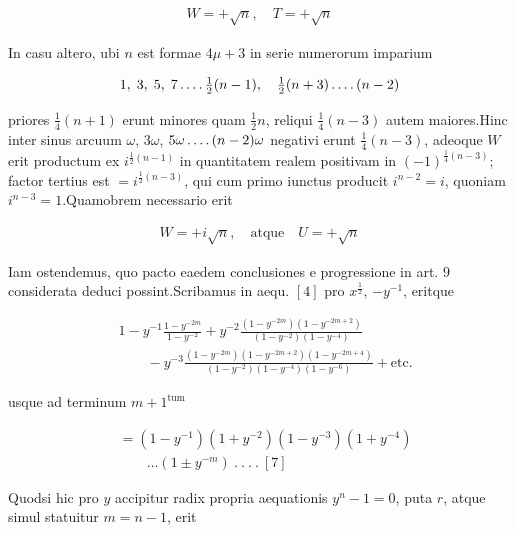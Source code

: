\[
\begin{aligned}
W=+\surd n,\quad T=+\surd n
\end{aligned}
\]

In casu altero, ubi $n$ est formae $4\mu+3$ in serie numerorum imparium

\[
\begin{aligned}
1,\;3,\;5,\;7\mathinner{.\,.\,.\,.}\tfrac12(n-1),\quad\tfrac12(n+3)\mathinner{.\,.\,.\,.}(n-2)
\end{aligned}
\]

priores $\frac14(n+1)$ erunt minores quam $\frac12n$, reliqui $\frac14(n-3)$ autem maiores.\quad Hinc inter sinus arcuum $\omega$, $3\omega$, $5\omega\mathinner{.\,.\,.\,.}(n-2)\omega$ negativi erunt $\frac14(n-3)$, adeoque $W$ erit productum ex $i^{\frac12(n-1)}$ in quantitatem realem positivam in $(-1)^{\frac14(n-3)}$; factor tertius est $=i^{\frac12(n-3)}$, qui cum primo iunctus producit $i^{n-2}=i$, quoniam $i^{n-3}=1$.\quad Quamobrem necessario erit

\[
\begin{aligned}
W=+i\surd n,\quad\text{atque}\quad U=+\surd n
\end{aligned}
\]


Iam ostendemus, quo pacto eaedem conclusiones e progressione in art. $9$ considerata deduci possint.\quad Scribamus in aequ. $[4]$ pro $x^{\frac12}$, $-y^{-1}$, eritque

%
\[
\begin{aligned}
&1-y^{-1}\frac{1-y^{-2m}}{1-y^{-2}}+y^{-2}\frac{(1-y^{-2m})(1-y^{-2m+2})}{(1-y^{-2})(1-y^{-4})}\\&\qquad-y^{-3}\frac{(1-y^{-2m})(1-y^{-2m+2})(1-y^{-2m+4})}{(1-y^{-2})(1-y^{-4})(1-y^{-6})}+\text{etc.}
\end{aligned}
\]

usque ad terminum $m+1^{\mathrm{tum}}$

\[
\begin{aligned}
&=(1-y^{-1})(1+y^{-2})(1-y^{-3})(1+y^{-4})\\&\qquad\ldots(1\pm y^{-m})\  .\  .\  .\  .\ [7]
\end{aligned}
\]

Quodsi hic pro $y$ accipitur radix propria aequationis $y^n-1=0$, puta $r$, atque simul statuitur $m=n-1$, erit

